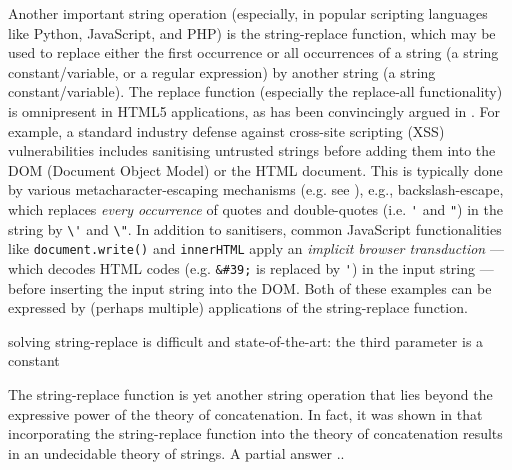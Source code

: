 Another important string operation (especially, in popular scripting
languages like Python, JavaScript, and PHP) is the string-replace function, 
which may be used to replace either the first occurrence or
all occurrences of a string (a string constant/variable, or a regular expression) by 
another string (a string constant/variable). The replace function (especially 
the replace-all functionality) is omnipresent in HTML5 applications, as has
been convincingly argued in \cite{LB16,TCJ16,YABI14}. For
example, a standard industry defense against cross-site scripting 
(XSS) vulnerabilities includes sanitising untrusted strings before adding them
into the DOM (Document Object Model) or the HTML document. 
This is typically done by %
various metacharacter-escaping mechanisms (e.g. see 
\cite{Kern14,BEK,OWASP-XSS}), e.g., backslash-escape, which replaces \emph{every
occurrence} of quotes and double-quotes (i.e. \verb+'+ and \verb+"+) in the
string by \verb+\'+ and \verb+\"+. 
In addition
to sanitisers, common JavaScript functionalities like \texttt{document.write()} 
and \texttt{innerHTML} apply an \emph{implicit browser transduction} --- which
decodes HTML codes (e.g. \verb+&#39;+ is replaced by \verb+'+) in the input 
string --- before inserting the input string into the DOM.
Both of these examples can be expressed by (perhaps multiple) 
applications of the string-replace function.



solving string-replace is difficult and state-of-the-art: the third parameter is a constant

The string-replace function is yet another string operation that lies beyond 
the expressive power of the theory of concatenation. In fact, it was shown in
\cite{LB16} that incorporating the string-replace function into the theory of 
concatenation results in an undecidable theory of strings. A partial answer ..

\OMIT{
Such string functions, however, cannot
be modelled by 


Such a function is frequently used in 



One important application %
for the analysis of string-manipulating programs is an automatic detection
of cross-site scripting (XSS) vulnerabilities
\cite{Berkeley-JavaScript}, which are typically caused by improper handling
of untrusted strings leading to an execution of malicious script in the
clients' browsers. A standard industry defense against XSS is to sanitise these
untrusted strings before adding them into the DOM (Document Object Model) or 
the HTML document. This is typically done by %
certain metacharacter-escaping mechanisms (e.g. see 
\cite{Kern14,BEK,OWASP-XSS}), e.g., backslash-escape, which replaces every 
occurrence of quotes and double-quotes (i.e. \verb+'+ and \verb+"+) in the
string by \verb+\'+ and \verb+\"+. Such string functions, however, cannot
be modelled by 
}

